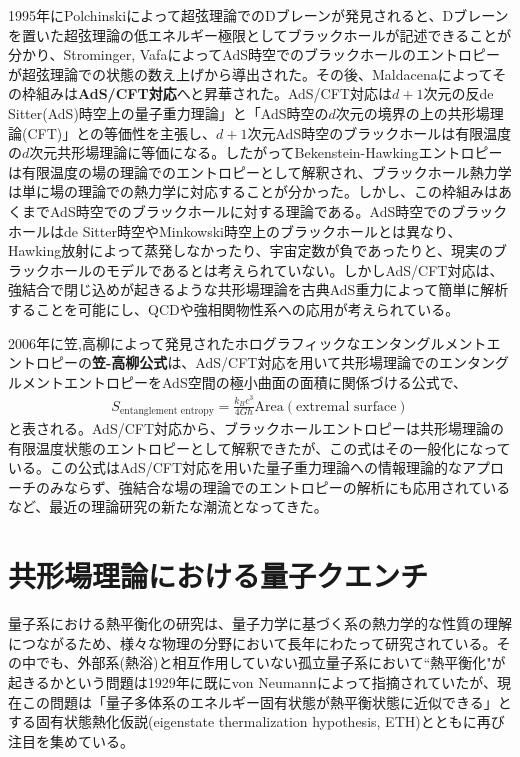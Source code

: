 1995年にPolchinski\cite{Polchinski:1995mt}によって超弦理論でのDブレーンが発見されると、Dブレーンを置いた超弦理論の低エネルギー極限としてブラックホールが記述できることが分かり、Strominger, Vafa\cite{Strominger:1996sh}によってAdS時空でのブラックホールのエントロピーが超弦理論での状態の数え上げから導出された。その後、Maldacena\cite{Maldacena:1997re}によってその枠組みは\textbf{AdS/CFT対応}へと昇華された。AdS/CFT対応は$d+1$次元の反de Sitter(AdS)時空上の量子重力理論」と「AdS時空の$d$次元の境界の上の共形場理論(CFT)」との等価性を主張し、$d+1$次元AdS時空のブラックホールは有限温度の$d$次元共形場理論に等価になる。したがってBekenstein-Hawkingエントロピーは有限温度の場の理論でのエントロピーとして解釈され、ブラックホール熱力学は単に場の理論での熱力学に対応することが分かった。しかし、この枠組みはあくまでAdS時空でのブラックホールに対する理論である。AdS時空でのブラックホールはde Sitter時空やMinkowski時空上のブラックホールとは異なり、Hawking放射によって蒸発しなかったり、宇宙定数が負であったりと、現実のブラックホールのモデルであるとは考えられていない。しかしAdS/CFT対応は、強結合で閉じ込めが起きるような共形場理論を古典AdS重力によって簡単に解析することを可能にし、QCD\cite{Sakai:2004cn}\cite{Kovtun:2004de}や強相関物性系\cite{Hartnoll_2009}への応用が考えられている。

2006年に笠,高柳によって発見されたホログラフィックなエンタングルメントエントロピーの\textbf{笠-高柳公式}\cite{Ryu:2006ef}は、AdS/CFT対応を用いて共形場理論でのエンタングルメントエントロピーをAdS空間の極小曲面の面積に関係づける公式で、
\begin{align}
S_\text{entanglement entropy}=\frac{k_B c^3}{4G \hbar}\text{Area}(\text{extremal surface})
\end{align}
と表される。AdS/CFT対応から、ブラックホールエントロピーは共形場理論の有限温度状態のエントロピーとして解釈できたが、この式はその一般化になっている。この公式はAdS/CFT対応を用いた量子重力理論への情報理論的なアプローチのみならず、強結合な場の理論でのエントロピーの解析にも応用されているなど、最近の理論研究の新たな潮流となってきた。

\section*{共形場理論における量子クエンチ}
量子系における熱平衡化の研究は、量子力学に基づく系の熱力学的な性質の理解につながるため、様々な物理の分野において長年にわたって研究されている。その中でも、外部系(熱浴)と相互作用していない孤立量子系において``熱平衡化"が起きるかという問題は1929年に既にvon Neumann\cite{Neumann1929}\cite{von_Neumann_2010}によって指摘されていたが、現在この問題は「量子多体系のエネルギー固有状態が熱平衡状態に近似できる」とする固有状態熱化仮説(eigenstate thermalization hypothesis, ETH)\cite{Deutsch1991}\cite{Srednicki1994}とともに再び注目を集めている。

